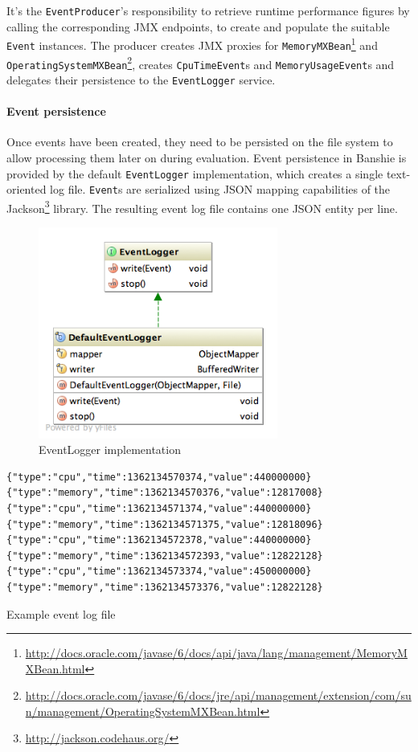 It's the \texttt{EventProducer}'s responsibility to retrieve runtime performance figures by calling the corresponding \gls{JMX} endpoints, to create and populate the suitable \texttt{Event} instances. The producer creates \gls{JMX} proxies for \texttt{MemoryMXBean}\footnote{\url{http://docs.oracle.com/javase/6/docs/api/java/lang/management/MemoryMXBean.html}} and \texttt{OperatingSystemMXBean}\footnote{\url{http://docs.oracle.com/javase/6/docs/jre/api/management/extension/com/sun/management/OperatingSystemMXBean.html}}, creates \texttt{CpuTimeEvent}s and \texttt{MemoryUsageEvent}s and delegates their persistence to the \texttt{EventLogger} service.

\paragraph{Event persistence}
Once events have been created, they need to be persisted on the file system to allow processing them later on during evaluation. Event persistence in Banshie is provided by the default \texttt{EventLogger} implementation, which creates a single text-oriented log file. \texttt{Event}s are serialized using \gls{JSON} mapping capabilities of the Jackson\footnote{\url{http://jackson.codehaus.org/}} library. The resulting event log file contains one \gls{JSON} entity per line.

\begin{figure}[H]
\centering
\includegraphics[width=0.7\textwidth]{logging.png}
\caption{EventLogger implementation}
\end{figure}

\begin{listing}[H]
\begin{verbatim}
{"type":"cpu","time":1362134570374,"value":440000000}
{"type":"memory","time":1362134570376,"value":12817008}
{"type":"cpu","time":1362134571374,"value":440000000}
{"type":"memory","time":1362134571375,"value":12818096}
{"type":"cpu","time":1362134572378,"value":440000000}
{"type":"memory","time":1362134572393,"value":12822128}
{"type":"cpu","time":1362134573374,"value":450000000}
{"type":"memory","time":1362134573376,"value":12822128}
\end{verbatim}
\caption{Example event log file}
\label{lst:event-log}
\end{listing}

